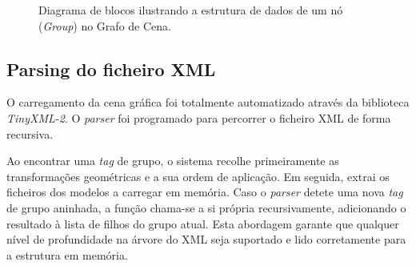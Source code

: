 \documentclass[12pt,a4paper]{article}
\begin{document}
\begin{figure}[H]
    \centering
    \caption{Diagrama de blocos ilustrando a estrutura de dados de um nó (\textit{Group}) no Grafo de Cena.}
    \label{fig:scene_graph}
\end{figure}

\subsection{Parsing do ficheiro XML} 
O carregamento da cena gráfica foi totalmente automatizado através da biblioteca \textit{TinyXML-2}. O \textit{parser} foi programado para percorrer o ficheiro XML de forma recursiva.

Ao encontrar uma \textit{tag} de grupo, o sistema recolhe primeiramente as transformações geométricas e a sua ordem de aplicação. Em seguida, extrai os ficheiros dos modelos a carregar em memória. Caso o \textit{parser} detete uma nova \textit{tag} de grupo aninhada, a função chama-se a si própria recursivamente, adicionando o resultado à lista de filhos do grupo atual. Esta abordagem garante que qualquer nível de profundidade na árvore do XML seja suportado e lido corretamente para a estrutura em memória.
\end{document}

